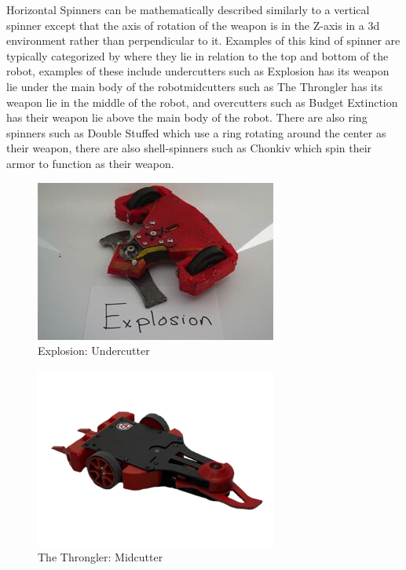\documentclass[conference]{IEEEtran}
\begin{document}
\newpage

Horizontal Spinners can be mathematically described similarly to a vertical spinner except that the axis of rotation of the weapon is in the Z-axis in a 3d environment rather than perpendicular to it.  Examples of this kind of spinner are typically categorized by where they lie in relation to the top and bottom of the robot, examples of these include undercutters such as Explosion has its weapon lie under the main body of the robotmidcutters such as The Throngler has its weapon lie in the middle of the robot, and overcutters such as Budget Extinction has their weapon lie above the main body of the robot.  There are also ring spinners such as Double Stuffed which use a ring rotating around the center as their weapon, there are also shell-spinners such as Chonkiv which spin their armor to function as their weapon.

\begin{figure}[htp]
\centering
\includegraphics[scale=0.4]{explosion.jpg}
\caption{Explosion: Undercutter \cite{b2}}
\label{Explosion: Undercutter}
\end{figure}

\begin{figure}[htp]
\centering
\includegraphics[scale=0.4]{throngler.png}
\caption{The Throngler: Midcutter}
\label{The Throngler: Midcutter}
\end{figure}
\end{document}
